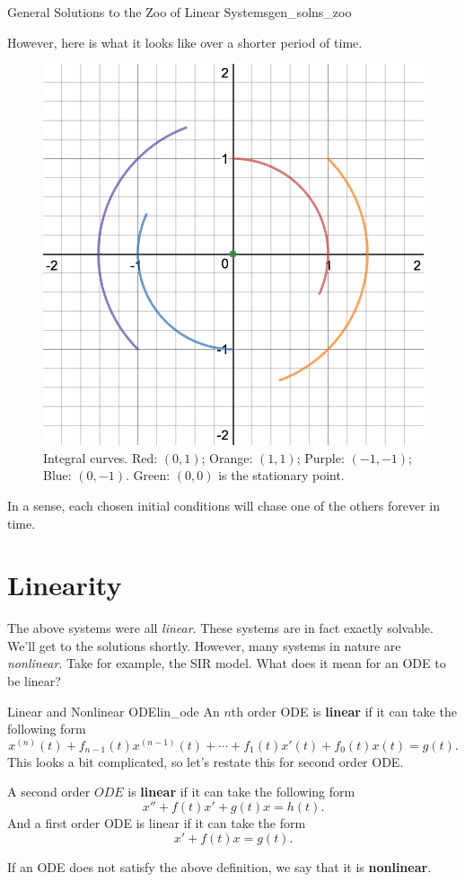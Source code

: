 \begin{ex}{General Solutions to the Zoo of Linear Systems}{gen_solns_zoo}
\begin{enumerate}[(I)]
\begin{figure}[H]
                \label{fig:my_label}
            \end{figure}
            However, here is what it looks like over a shorter period of time.
            \begin{figure}[H]
                \centering
                \includegraphics[width=.6\textwidth]{Figures/y-xintegralcurves2.png}
                \caption{Integral curves. Red: $(0,1)$; Orange: $(1,1)$; Purple: $(-1,-1)$; Blue: $(0,-1)$. Green: $(0,0)$ is the stationary point.}
                \label{fig:my_label}
            \end{figure}
            In a sense, each chosen initial conditions will chase one of the others forever in time.
        \end{enumerate}
        \end{ex}
        
        \section{Linearity}
        The above systems were all \emph{linear}.  These systems are in fact exactly solvable.  We'll get to the solutions shortly.  However, many systems in nature are \emph{nonlinear}.  Take for example, the SIR model. What does it mean for an ODE to be linear? 
        
        \begin{df}{Linear and Nonlinear ODE}{lin_ode}
        An $n$th order ODE is \textbf{linear} if it can take the following form
        \[
        x^{(n)}(t)+f_{n-1}(t)x^{(n-1)}(t)+\cdots + f_1(t)x'(t) +f_0(t)x(t)=g(t).
        \]
        This looks a bit complicated, so let's restate this for second order ODE.
        
        A second order $ODE$ is \textbf{linear} if it can take the following form
        \[
        x''+f(t)x'+g(t)x=h(t).
        \]
        And a first order ODE is linear if it can take the form
        \[
        x'+f(t)x=g(t).
        \]
        
        If an ODE does not satisfy the above definition, we say that it is \textbf{nonlinear}.
        \end{df}
        
